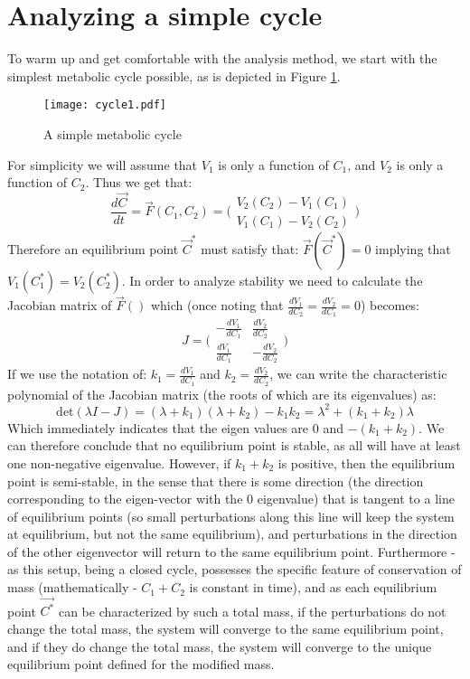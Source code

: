 \documentclass[a4page,notitlepage]{article}
\begin{document}
\section{Analyzing a simple cycle}
To warm up and get comfortable with the analysis method, we start with the simplest metabolic cycle possible, as is depicted in Figure \ref{simple-cycle}.
\begin{figure}[h]
\centering
\texttt{[image: cycle1.pdf]}
\caption{A simple metabolic cycle}
\label{simple-cycle}
\end{figure}
For simplicity we will assume that $V_1$ is only a function of $C_1$, and $V_2$ is only a function of $C_2$.
Thus we get that:
\[\frac{d\vec{C}}{dt}=\vec{F}(C_1,C_2) = \bigg(
\begin{matrix}
    V_2(C_2)-V_1(C_1) \\
    V_1(C_1)-V_2(C_2)
\end{matrix}
\bigg)\]
Therefore an equilibrium point $\vec{C}^*$ must satisfy that: $\vec{F}(\vec{C}^*)=0$ implying that $V_1(C_1^*)=V_2(C_2^*)$.
In order to analyze stability we need to calculate the Jacobian matrix of $\vec{F}()$ which (once noting that $\frac{dV_1}{dC_2}=\frac{dV_2}{dC_1}=0$) becomes:
\[
J=\bigg(
\begin{matrix}
    -\frac{dV_1}{dC_1} & \frac{dV_2}{dC_2} \\
    \frac{dV_1}{dC_1} & -\frac{dV_2}{dC_2}
\end{matrix}
\bigg)
\]
If we use the notation of: $k_1=\frac{dV_1}{dC_1}$ and $k_2=\frac{dV_2}{dC_2}$, we can write the characteristic polynomial of the Jacobian matrix (the roots of which are its eigenvalues) as:
\[
\text{det}(\lambda I -J)=(\lambda+k_1)(\lambda+k_2)-k_1k_2=\lambda^2+(k_1+k_2)\lambda
\]
Which immediately indicates that the eigen values are $0$ and $-(k_1+k_2)$.
We can therefore conclude that no equilibrium point is stable, as all will have at least one non-negative eigenvalue.
However, if $k_1+k_2$ is positive, then the equilibrium point is semi-stable, in the sense that there is some direction (the direction corresponding to the eigen-vector with the $0$ eigenvalue) that is tangent to a line of equilibrium points (so small perturbations along this line will keep the system at equilibrium, but not the same equilibrium), and perturbations in the direction of the other eigenvector will return to the same equilibrium point.
Furthermore - as this setup, being a closed cycle, possesses the specific feature of conservation of mass (mathematically - $C_1+C_2$ is constant in time), and as each equilibrium point $\vec{C^*}$ can be characterized by such a total mass, if the perturbations do not change the total mass, the system will converge to the same equilibrium point, and if they do change the total mass, the system will converge to the unique equilibrium point defined for the modified mass.
\end{document}
